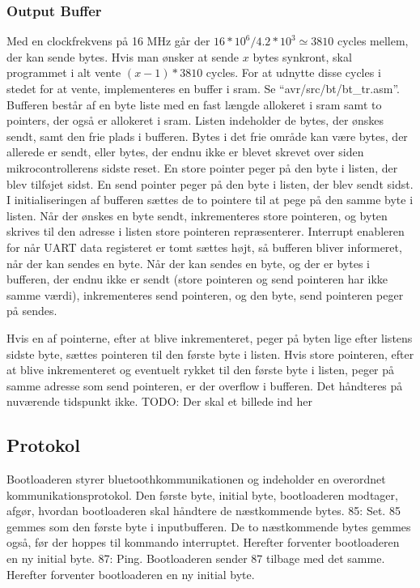 \subsubsection{Output Buffer}
Med en clockfrekvens på 16 MHz går der $16*10^6 / 4.2*10^3 \simeq 3810$ cycles mellem, der kan sende bytes. Hvis man ønsker at sende $x$ bytes synkront, skal programmet i alt vente $(x-1)*3810$ cycles. For at udnytte disse cycles i stedet for at vente, implementeres en buffer i sram.
Se ``avr/src/bt/bt\_tr.asm''.
Bufferen består af en byte liste med en fast længde allokeret i sram samt to pointers, der også er allokeret i sram. Listen indeholder de bytes, der ønskes sendt, samt den frie plads i bufferen. Bytes i det frie område kan være bytes, der allerede er sendt, eller bytes, der endnu ikke er blevet skrevet over siden mikrocontrollerens sidste reset. En store pointer peger på den byte i listen, der blev tilføjet sidst. En send pointer peger på den byte i listen, der blev sendt sidst.
I initialiseringen af bufferen sættes de to pointere til at pege på den samme byte i listen.
Når der ønskes en byte sendt, inkrementeres store pointeren, og byten skrives til den adresse i listen store pointeren repræsenterer. Interrupt enableren for når UART data registeret er tomt sættes højt, så bufferen bliver informeret, når der kan sendes en byte.
Når der kan sendes en byte, og der er bytes i bufferen, der endnu ikke er sendt (store pointeren og send pointeren har ikke samme værdi), inkrementeres send pointeren, og den byte, send pointeren peger på sendes.

Hvis en af pointerne, efter at blive inkrementeret, peger på byten lige efter listens sidste byte, sættes pointeren til den første byte i listen.
Hvis store pointeren, efter at blive inkrementeret og eventuelt rykket til den første byte i listen, peger på samme adresse som send pointeren, er der overflow i bufferen. Det håndteres på nuværende tidspunkt ikke.
TODO: Der skal et billede ind her

\subsection{Protokol}
Bootloaderen styrer bluetoothkommunikationen og indeholder en overordnet kommunikationsprotokol.
Den første byte, initial byte, bootloaderen modtager, afgør, hvordan bootloaderen skal håndtere de næstkommende bytes.
85: Set. 85 gemmes som den første byte i inputbufferen. De to næstkommende bytes gemmes også, før der hoppes til kommando interruptet. Herefter forventer bootloaderen en ny initial byte.
87: Ping. Bootloaderen sender 87 tilbage med det samme. Herefter forventer bootloaderen en ny initial byte.

